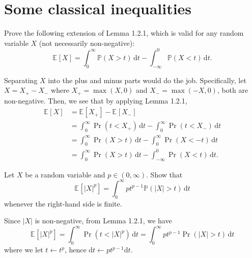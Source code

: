 \section{Some classical inequalities}
\begin{problem*}[Exercise 1.2.2]\label{ex1.2.2}
	Prove the following extension of Lemma 1.2.1, which is valid for any random variable \(X\) (not necessarily non-negative):
	\[
		\mathbb{E}_{}[X]
		= \int_{0}^{\infty} \mathbb{P} (X > t) \,\mathrm{d}t - \int_{-\infty}^{0} \mathbb{P} (X < t) \,\mathrm{d}t.
	\]
\end{problem*}
\begin{answer}
	Separating \(X\) into the plus and minus parts would do the job. Specifically, let \(X = X_+ - X_-\) where \(X_+ = \max (X, 0)\) and \(X_- = \max (-X, 0)\), both are non-negative. Then, we see that by applying Lemma 1.2.1,
	\[
		\begin{split}
			\mathbb{E}_{}\left[X \right]
			 & = \mathbb{E}_{}\left[X_+ \right] - \mathbb{E}_{}\left[X_- \right]                                    \\
			 & = \int_{0}^{\infty} \Pr_{}(t < X_+)  \,\mathrm{d}t - \int_{0}^{\infty} \Pr_{}(t < X_-) \,\mathrm{d}t \\
			 & = \int_{0}^{\infty} \Pr_{}(X > t) \,\mathrm{d}t - \int_{0}^{\infty} \Pr_{}(X < -t) \,\mathrm{d}t     \\
			 & = \int_{0}^{\infty} \Pr_{}(X > t) \,\mathrm{d}t - \int_{-\infty}^{0} \Pr_{}(X < t) \,\mathrm{d}t.
		\end{split}
	\]
\end{answer}

\begin{problem*}[Exercise 1.2.3]\label{ex1.2.3}
	Let \(X\) be a random variable and \(p \in (0, \infty )\). Show that
	\[
		\mathbb{E}_{}[\lvert X \rvert ^p]
		= \int_{0}^{\infty} p t^{p-1} \mathbb{P} (\lvert X \rvert > t) \,\mathrm{d}t
	\]
	whenever the right-hand side is finite.
\end{problem*}
\begin{answer}
	Since \(\vert X \vert \) is non-negative, from Lemma 1.2.1, we have
	\[
		\mathbb{E}_{}\left[\vert X \vert ^p \right]
		= \int_{0}^{\infty} \Pr_{}(t < \vert X \vert ^p) \,\mathrm{d}t
		= \int_{0}^{\infty} p t^{p-1} \Pr_{}(\vert X \vert > t) \,\mathrm{d}t
	\]
	where we let \(t \gets t^p\), hence \(\mathrm{d} t \gets p t^{p-1} \mathrm{d} t\).
\end{answer}